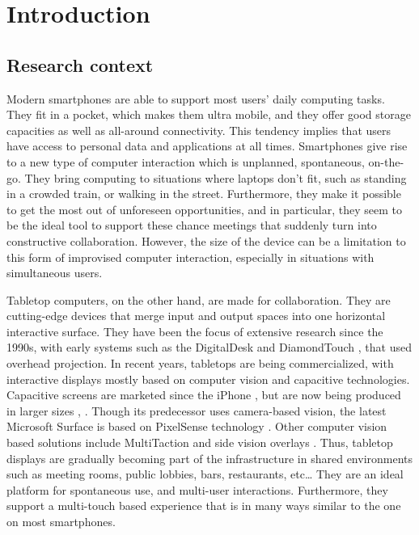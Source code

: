 

%

\chapter{Introduction}
\label{introduction}

\section{Research context}

Modern smartphones are able to support most users' daily computing tasks.
They fit in a pocket, which makes them ultra mobile, and they offer good storage capacities as well as all-around connectivity.
This tendency implies that users have access to personal data and applications at all times.
Smartphones give rise to a new type of computer interaction which is unplanned, spontaneous, on-the-go.
They bring computing to situations where laptops don't fit, such as standing in a crowded train, or walking in the street.
Furthermore, they make it possible to get the most out of unforeseen opportunities, and in particular, they seem to be the ideal tool to support these chance meetings that suddenly turn into constructive collaboration.
However, the size of the device can be a limitation to this form of improvised computer interaction, especially in situations with simultaneous users. 

Tabletop computers, on the other hand, are made for collaboration.
They are cutting-edge devices that merge input and output spaces into one horizontal interactive surface.
They have been the focus of extensive research since the 1990s, with early systems such as the DigitalDesk \citep{Wellner:1993:digitaldesk} and DiamondTouch \citep{Dietz:2001:diamondtouch}, that used overhead projection.
In recent years, tabletops are being commercialized, with interactive displays mostly based on computer vision and capacitive technologies.
Capacitive screens are marketed since the iPhone \citep{iphone}, but are now being produced in larger sizes \citep{displax}, \citep{3m}.
Though its predecessor uses camera-based vision, the latest Microsoft Surface \citep{ms} is based on PixelSense technology \citep{pixelsense}.
Other computer vision based solutions include MultiTaction \citep{multitouch} and side vision overlays \citep{pq}.
Thus, tabletop displays are gradually becoming part of the infrastructure in shared environments such as meeting rooms, public lobbies, bars, restaurants, etc\ldots
They are an ideal platform for spontaneous use, and multi-user interactions.
Furthermore, they support a multi-touch based experience that is in many ways similar to the one on most smartphones.

